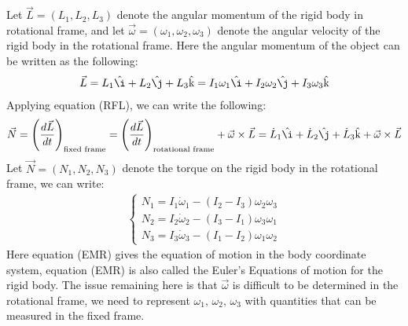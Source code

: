 \documentclass[11pt,oneside]{book}
\theoremstyle{break}
\theoremstyle{break}
\newcommand{\khat}{\hat{\text{k}}}
\newcommand{\ihat}{\hat{\i}}
\newcommand{\jhat}{\hat{\j}}
\begin{document}
Let $\vec{L} = (L_1,L_2,L_3)$ denote the angular momentum of the rigid body in rotational frame, and let $\vec{\omega}= (\omega_1, \omega_2, \omega_3)$ denote the angular velocity of the rigid body in the rotational frame. Here the angular momentum of the object can be written as the following:
\begin{align*}
\vec{L} = L_1 \ihat + L_2 \jhat + L_3 \khat = I_1 \omega_1 \ihat + I_2 \omega_2 \jhat + I_3 \omega_3 \khat
\end{align*}
Applying equation (RFL), we can write the following:
\begin{align*}
\vec{N} = \left(\frac{d\vec{L}}{dt}\right)_{\text{fixed frame}} = \left(\frac{d\vec{L}}{dt}\right)_{\text{rotational frame}} + \vec{\omega}\times \vec{L} = \dot{L}_1 \ihat + \dot{L}_2\jhat + \dot{L}_3 \khat + \vec{\omega}\times \vec{L}
\end{align*}
Let $\vec{N} = (N_1, N_2, N_3)$ denote the torque on the rigid body in the rotational frame, we can write:
\begin{align*}
\begin{cases}
N_1 = I_1 \dot{\omega}_1 - (I_2-I_3)\omega_2 \omega_3 \\
N_2 = I_2 \dot{\omega}_2 - (I_3 - I_1) \omega_3 \omega_1 \\
N_3 = I_3 \dot{\omega}_3 - (I_1 - I_2) \omega_1 \omega_2
\end{cases} \tag{EMR}
\end{align*}
Here equation (EMR) gives the equation of motion in the body coordinate system, equation (EMR) is also called the Euler's Equations of motion for the rigid body. The issue remaining here is that $\vec{\omega}$ is difficult to be determined in the rotational frame, we need to represent $\omega_1,\, \omega_2,\, \omega_3$ with quantities that can be measured in the fixed frame.\\
\end{document}
